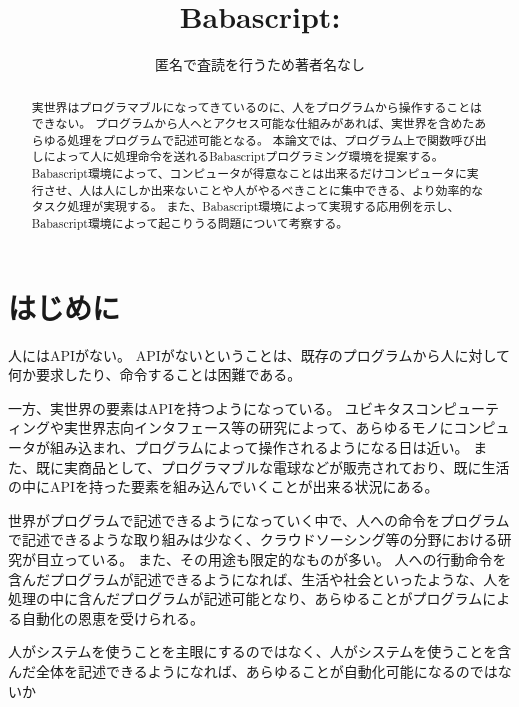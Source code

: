 \title{Babascript: }


\author{匿名で査読を行うため著者名なし
  }

\begin{abstract}

実世界はプログラマブルになってきているのに、人をプログラムから操作することはできない。
プログラムから人へとアクセス可能な仕組みがあれば、実世界を含めたあらゆる処理をプログラムで記述可能となる。
本論文では、プログラム上で関数呼び出しによって人に処理命令を送れるBabascriptプログラミング環境を提案する。
Babascript環境によって、コンピュータが得意なことは出来るだけコンピュータに実行させ、人は人にしか出来ないことや人がやるべきことに集中できる、より効率的なタスク処理が実現する。
また、Babascript環境によって実現する応用例を示し、Babascript環境によって起こりうる問題について考察する。

\end{abstract}

\maketitle

\section{はじめに}\label{ux306fux3058ux3081ux306b}

人にはAPIがない。
APIがないということは、既存のプログラムから人に対して何か要求したり、命令することは困難である。

一方、実世界の要素はAPIを持つようになっている。
ユビキタスコンピューティングや実世界志向インタフェース等の研究によって、あらゆるモノにコンピュータが組み込まれ、プログラムによって操作されるようになる日は近い。
また、既に実商品として、プログラマブルな電球などが販売されており、既に生活の中にAPIを持った要素を組み込んでいくことが出来る状況にある。

世界がプログラムで記述できるようになっていく中で、人への命令をプログラムで記述できるような取り組みは少なく、クラウドソーシング等の分野における研究が目立っている。
また、その用途も限定的なものが多い。
人への行動命令を含んだプログラムが記述できるようになれば、生活や社会といったような、人を処理の中に含んだプログラムが記述可能となり、あらゆることがプログラムによる自動化の恩恵を受けられる。

人がシステムを使うことを主眼にするのではなく、人がシステムを使うことを含んだ全体を記述できるようになれば、あらゆることが自動化可能になるのではないか

